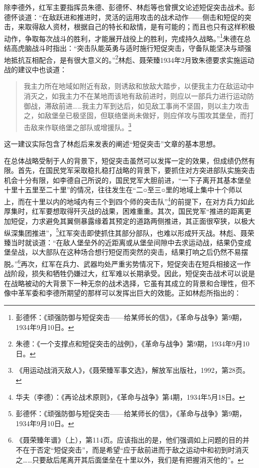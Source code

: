 除李德外，红军主要指挥员朱德、彭德怀、林彪等也曾撰文论述短促突击战术。彭德怀谈道：“在敌跃进和推进时，灵活的运用攻击的战术动作——侧击和短促的突击，来取得敌人资材，根据自己的特长和敌情，是有可能的；而且也只有这样积极动作，争取每次战斗的胜利，才能展开战役上的胜利，完成持久战略。”\footnote{彭德怀：《顽强防御与短促突击——给某师长的信》，《革命与战争》第9期，1934年9月10日。}朱德在总结高虎脑战斗时指出：“突击队能英勇与适时施行短促突击，守备队能坚决与顽强地抵抗互相配合，是有很大意义的。”\footnote{朱德：《一个支撑点和短促突击的战例》，《革命与战争》第9期，1934年9月10日。}林彪、聂荣臻1934年2月致朱德要求实施运动战的建议中也谈道：

\begin{quote}

我主力所在地域如附近有敌，则诱敌和放敌大踏步，以便我主力在敌运动中消灭之，如我主力不在某地而该地有敌前进时，则应以一部兵力进行运动防御战，滞敌前进……我主力军到达后，如见敌工事尚不坚固，则以主力攻击之，如敌堡垒已极坚固，但联络堡尚未做好，则应佯攻与围攻其堡垒，而打击敌来作联络堡之部队或增援队。\footnote{《用运动战消灭敌人》，《聂荣臻军事文选》，解放军出版社，1992，第28页。}
\end{quote}


这一建议实际包含了林彪后来发表的阐述“短促突击”文章的基本思想。


在总体战略受制于人的背景下，短促突击虽然可以发挥一定的效果，但成绩仍然有限。首先，在国民党军采取稳扎稳打战略的背景下，要抓住对方突进部队实施突击机会十分有限，如李德自己所说的，国民党军大胆前进，“一下子离开其基本堡垒十里十五里至二十里”的情况，往往发生在“二○至三○里的地域上集中十个师以上，而在十里以内的地域内有三个到四个师的突击队”\footnote{华夫（李德）：《再论战术原则》，《革命与战争》第4期，1934年5月18日。}的前提下，在对方兵力如此厚集时，红军要想取得歼灭战的战果，困难重重。其次，国民党军“推进的距离更加短促，力求避免其翼侧暴露缘着其预定的道路两侧推进，其正面很窄狭，以极大纵深集团推进”，\footnote{彭德怀：《顽强防御与短促突击——给某师长的信》，《革命与战争》第9期，1934年9月10日。}红军突击即使抓住其部分部队，也难以形成歼灭战。林彪、聂荣臻当时就谈道：“在敌人堡垒外的近距离或从堡垒间隙中去求运动战，结果仍变成堡垒战，以大部队在这种场合想行短促而突然的突击，结果打响之后仍然不易摆脱。”\footnote{《聂荣臻年谱》（上），第114页。应该指出的是，他们强调如上问题的目的并不在于否定“短促突击”，而是希望“应于敌前进而于敌之运动中和初到时消灭之……只要敌后尾离开其后面堡垒在十里以外，我们是有把握消灭他的”。}再次，红军在兵力、武器均处严重劣势情况下，短促突击在短兵相接这一作战阶段，损失和牺牲仍嫌过大，红军难以长期承受。因此，短促突击战术可以说是在战略被动的大背景下一种无奈的战术选择，它虽有其成立的背景和合理性，但不像中革军委和李德所期望的那样可以发挥出巨大的效能。正如林彪所指出的：

